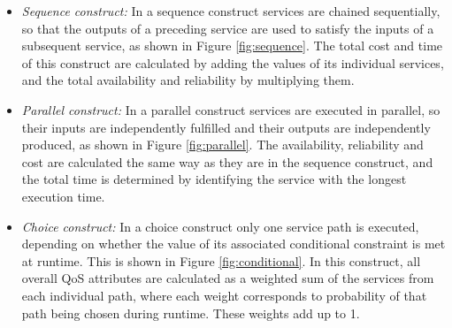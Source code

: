 \begin{itemize}
\item\textit{Sequence construct:} In a sequence construct services are chained sequentially, so that the outputs of a preceding service are used to satisfy the inputs of a subsequent service, as shown in Figure \ref{fig:sequence}. The total cost and time of this construct are calculated by adding the values of its individual services, and the total availability and reliability by multiplying them.
\item\textit{Parallel construct:} In a parallel construct services are executed in parallel, so their inputs are independently fulfilled and their outputs are independently produced, as shown in Figure \ref{fig:parallel}. The availability, reliability and cost are calculated the same way as they are in the sequence construct, and the total time is determined by identifying the service with the longest execution time. 
\item\textit{Choice construct:} In a choice construct only one service path is executed, depending on whether the value of its associated conditional constraint is met at runtime. This is shown in Figure \ref{fig:conditional}. In this construct, all overall QoS attributes are calculated as a weighted sum of the services from each individual path, where each weight corresponds to probability of that path being chosen during runtime. These weights add up to 1. 
\end{itemize}

